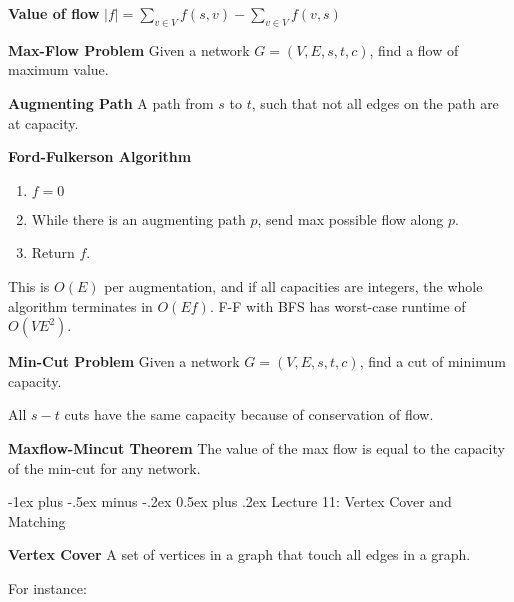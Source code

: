 \documentclass[10pt,landscape]{article}
\makeatletter
\renewcommand{\section}{\@startsection{section}{1}{0mm}%
                                {-1ex plus -.5ex minus -.2ex}%
                                {0.5ex plus .2ex}%
                                {\normalfont\large\bfseries}}
\newcommand{\definition}[1]{\textbf{#1}\hspace{2pt}}
\makeatother
\begin{document}
\begin{multicols}{3}
\definition{Value of flow} $|f| = \sum\limits_{v \in V} f(s, v) - \sum\limits_{v \in V} f(v,s)$

\definition{Max-Flow Problem} Given a network $G = (V, E, s, t, c)$, find a flow of maximum value.

\definition{Augmenting Path} A path from $s$ to $t$, such that not all edges on the path are at capacity.

\definition{Ford-Fulkerson Algorithm}

\begin{enumerate}
\item $f = 0$
\item While there is an augmenting path $p$, send max possible flow along $p$.
\item Return $f$.
\end{enumerate}

This is $O(E)$ per augmentation, and if all capacities are integers, the whole algorithm terminates in $O(Ef)$. F-F with BFS has worst-case runtime of $O(VE^2)$.

\definition{Min-Cut Problem} Given a network $G = (V, E, s, t, c)$, find a cut of minimum capacity.

All $s-t$ cuts have the same capacity because of conservation of flow.

\definition{Maxflow-Mincut Theorem} The value of the max flow is equal to the capacity of the min-cut for any network.

\section{Lecture 11: Vertex Cover and Matching}

\definition{Vertex Cover}  A set of vertices in a graph that touch all edges in a graph.

For instance:

\begin{center}
\end{center}


\end{multicols}
\end{document}
